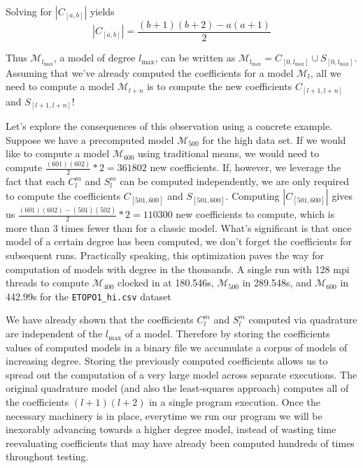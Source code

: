 \documentclass[a4paper]{article}
\theoremstyle{definition}
\begin{document}
Solving for $|C_{[a, b]}|$ yields 
\begin{equation}
    |C_{[a, b]}| = \frac{(b + 1)(b + 2) - a(a + 1)}{2} \label{fig:cardinality}
\end{equation}

Thus $\mathcal{M}_{l_\mathrm{max}}$, a model of degree $l_{\mathrm{max}}$, can be written as $\mathcal{M}_{l_\mathrm{max}} = C_{[0, l_{\mathrm{max}}]} \cup S_{[0, l_{\mathrm{max}}]}$. Assuming that we've already computed the coefficients for a model 
$\mathcal{M}_l$, all we need to compute a model $\mathcal{M}_{l + n}$ is to compute the new coefficients $C_{[l + 1, l + n]}$ and $S_{[l + 1, l + n]}$!

Let's explore the consequences of this observation using a concrete example. Suppose we have a precomputed model $\mathcal{M}_{500}$ for the high data set. If we would 
like to compute a model $\mathcal{M}_{600}$ using traditional means, we would need to compute $\frac{(601)(602)}{2} * 2 = 361802$ new coefficients. If, however, we leverage the fact
that each $C_l^m$ and $S_l^m$ can be computed independently, we are only required to compute the coefficients $C_{[501, 600]}$ and $S_{[501, 600]}$. Computing
$|C_{[501, 600]}|$ gives us $\frac{(601)(602) - (501)(502)}{2} * 2 = 110300$ new coefficients to compute, which is more than 3 times fewer than for a classic model. What's significant is that 
once model of a certain degree has been computed, we don't forget the coefficients for subsequent runs. Practically speaking, this optimization paves the way for computation of models with degree 
in the thousands. A single run with 128 mpi threads to compute $\mathcal{M}_{400}$ clocked in at 180.546s, $\mathcal{M}_{500}$ in 289.548s, and $\mathcal{M}_{600}$ in 442.99s for the \texttt{ETOPO1\_hi.csv} dataset 

We have already shown that the coefficients $C_l^m$ and $S_l^m$ computed via quadrature are independent of the $l_\mathrm{max}$ of a model. Therefore by storing the coefficients values of computed models in a 
binary file we accumulate a corpus of models of increasing degree. Storing the previously computed coefficients allows us to spread out the computation of a 
very large model across separate executions. The original quadrature model (and also the least-squares approach) computes all of the coefficients $(l + 1)(l + 2)$ 
in a single program execution. Once the necessary machinery is in place, everytime we run our program we will be inexorably advancing towards a higher degree 
model, instead of wasting time reevaluating coefficients that may have already been computed hundreds of times throughout testing.
\end{document}
